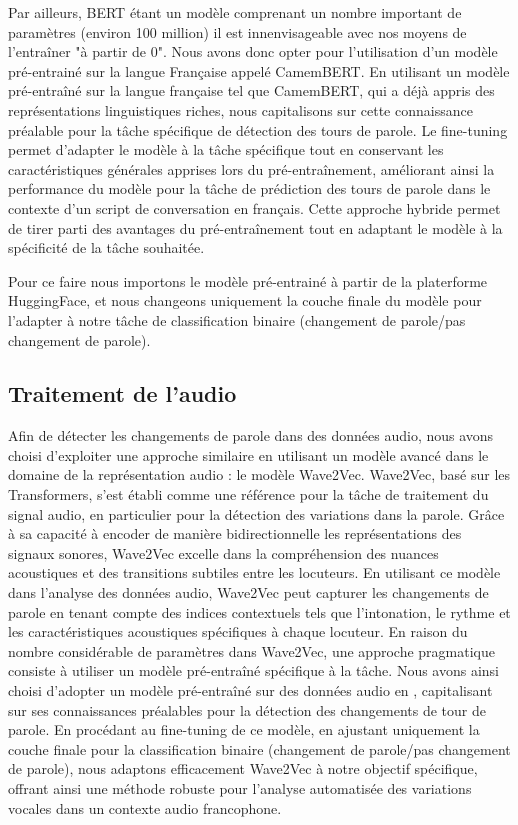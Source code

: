 \documentclass[a4paper]{article}
\begin{document}
Par ailleurs, BERT étant un modèle comprenant un nombre important de paramètres (environ 100 million) il est innenvisageable avec nos moyens de l'entraîner "à partir de 0". Nous avons donc opter pour l'utilisation d'un modèle pré-entrainé sur la langue Française appelé CamemBERT. En utilisant un modèle pré-entraîné sur la langue française tel que CamemBERT, qui a déjà appris des représentations linguistiques riches, nous capitalisons sur cette connaissance préalable pour la tâche spécifique de détection des tours de parole. Le fine-tuning permet d'adapter le modèle à la tâche spécifique tout en conservant les caractéristiques générales apprises lors du pré-entraînement, améliorant ainsi la performance du modèle pour la tâche de prédiction des tours de parole dans le contexte d'un script de conversation en français. Cette approche hybride permet de tirer parti des avantages du pré-entraînement tout en adaptant le modèle à la spécificité de la tâche souhaitée.

Pour ce faire nous importons le modèle pré-entrainé à partir de la platerforme HuggingFace, et nous changeons uniquement la couche finale du modèle pour l'adapter à notre tâche de classification binaire (changement de parole/pas changement de parole).


\subsection{Traitement de l'audio}

Afin de détecter les changements de parole dans des données audio, nous avons choisi d'exploiter une approche similaire en utilisant un modèle avancé dans le domaine de la représentation audio : le modèle Wave2Vec. Wave2Vec, basé sur les Transformers, s'est établi comme une référence pour la tâche de traitement du signal audio, en particulier pour la détection des variations dans la parole. Grâce à sa capacité à encoder de manière bidirectionnelle les représentations des signaux sonores, Wave2Vec excelle dans la compréhension des nuances acoustiques et des transitions subtiles entre les locuteurs. En utilisant ce modèle dans l'analyse des données audio, Wave2Vec peut capturer les changements de parole en tenant compte des indices contextuels tels que l'intonation, le rythme et les caractéristiques acoustiques spécifiques à chaque locuteur. En raison du nombre considérable de paramètres dans Wave2Vec, une approche pragmatique consiste à utiliser un modèle pré-entraîné spécifique à la tâche. Nous avons ainsi choisi d'adopter un modèle pré-entraîné sur des données audio en  , capitalisant sur ses connaissances préalables pour la détection des changements de tour de parole. En procédant au fine-tuning de ce modèle, en ajustant uniquement la couche finale pour la classification binaire (changement de parole/pas changement de parole), nous adaptons efficacement Wave2Vec à notre objectif spécifique, offrant ainsi une méthode robuste pour l'analyse automatisée des variations vocales dans un contexte audio francophone.
\end{document}

